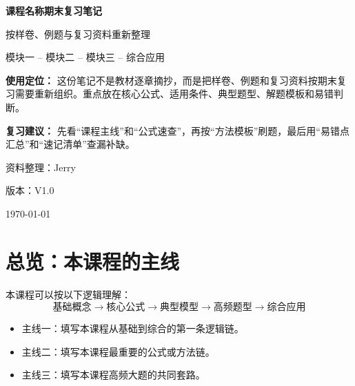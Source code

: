 \documentclass[UTF8,zihao=-4]{ctexart}
\newcommand{\CourseName}{课程名称}
\newcommand{\NoteTitle}{\CourseName 期末复习笔记}
\newcommand{\NoteSubtitle}{按样卷、例题与复习资料重新整理}
\newcommand{\MainLineText}{模块一 -- 模块二 -- 模块三 -- 综合应用}
\newcommand{\AuthorName}{Jerry}
\newcommand{\Version}{V1.0}
\begin{document}
\begin{titlepage}
\centering
\vspace*{2.5cm}

{\Huge\bfseries\sffamily \NoteTitle\par}

\vspace{0.8cm}

{\Large \NoteSubtitle\par}

\vspace{0.5cm}

{\large \MainLineText\par}

\vfill

\begin{tcolorbox}[
  colback=lightblue,
  colframe=mainblue,
  width=0.86\textwidth,
  arc=2mm
]
\textbf{使用定位：}
这份笔记不是教材逐章摘抄，而是把样卷、例题和复习资料按期末复习需要重新组织。重点放在核心公式、适用条件、典型题型、解题模板和易错判断。\par

\textbf{复习建议：}
先看“课程主线”和“公式速查”，再按“方法模板”刷题，最后用“易错点汇总”和“速记清单”查漏补缺。
\end{tcolorbox}

\vfill

{\large 资料整理：\AuthorName\par}
{\large 版本：\Version\par}
{\large \today\par}

\end{titlepage}

\tableofcontents
\newpage

\section{总览：本课程的主线}

本课程可以按以下逻辑理解：
\[
\text{基础概念} \to \text{核心公式} \to \text{典型模型} \to \text{高频题型} \to \text{综合应用}
\]

\begin{keybox}[本课程最终主线]
\begin{itemize}
  \item 主线一：填写本课程从基础到综合的第一条逻辑链。
  \item 主线二：填写本课程最重要的公式或方法链。
  \item 主线三：填写本课程高频大题的共同套路。
\end{itemize}
\end{keybox}
\end{document}
